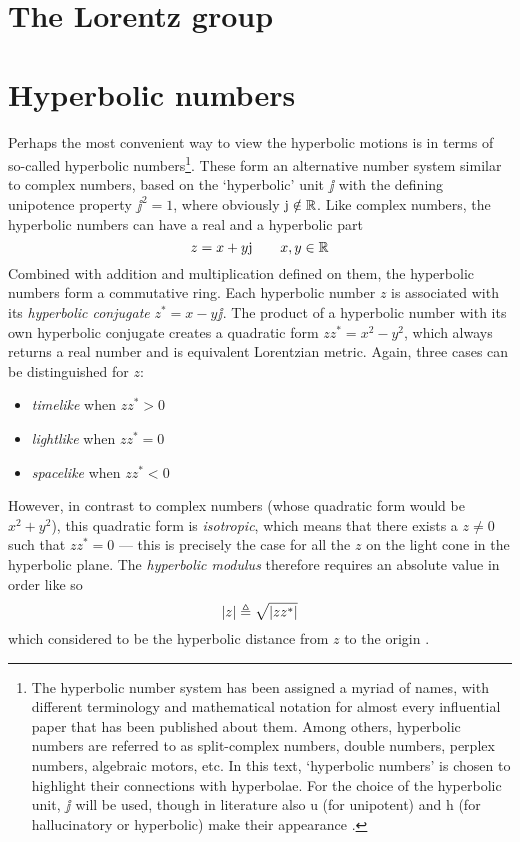 \section{The Lorentz group}

\section{Hyperbolic numbers}
Perhaps the most convenient way to view the hyperbolic motions is in terms of so-called hyperbolic numbers\footnote{The hyperbolic number system has been assigned a myriad of names, with different terminology and mathematical notation for almost every influential paper that has been published about them. Among others, hyperbolic numbers are referred to as split-complex numbers, double numbers, perplex numbers, algebraic motors, etc. In this text, `hyperbolic numbers' is chosen to highlight their connections with hyperbolae. For the choice of the hyperbolic unit, \(\jj\) will be used, though in literature also \(\mathrm{u}\) (for unipotent) and \(\mathrm{h}\) (for hallucinatory or hyperbolic) make their appearance \cite{Fjelstad1986, Sobczyk1995, Motter1998, Harkin2004}.}. These form an alternative number system similar to complex numbers, based on the `hyperbolic' unit \(\jj\) with the defining unipotence property \(\jj^2 = 1\), where obviously \(\mathrm{j} \notin \mathbb{R}\). Like complex numbers, the hyperbolic numbers can have a real and a hyperbolic part
\[
     z = x + y\mathrm{j} \qquad x, y \in \mathbb{R}
\]
Combined with addition and multiplication defined on them, the hyperbolic numbers form a commutative ring. Each hyperbolic number \(z\) is associated with its \emph{hyperbolic conjugate} \(z^* = x - y\jj\). The product of a hyperbolic number with its own hyperbolic conjugate creates a quadratic form \(zz^* = x^2 - y^2\), which always returns a real number and is equivalent Lorentzian metric. Again, three cases can be distinguished for \(z\):
\begin{itemize}
    \item \emph{timelike} when \(zz^* > 0\)
    \item \emph{lightlike} when \(zz^* = 0\)
    \item \emph{spacelike} when \(zz^* < 0\)
\end{itemize}
However, in contrast to complex numbers (whose quadratic form would be \(x^2 + y^2\)), this quadratic form is \emph{isotropic}, which means that there exists a \(z \neq 0\) such that \(zz^* = 0\) --- this is precisely the case for all the \(z\) on the light cone in the hyperbolic plane. The \emph{hyperbolic modulus} therefore requires an absolute value in order like so
\[
     \abs{z} \triangleq \sqrt{\abs{zz^*}}
\]
which considered to be the hyperbolic distance from \(z\) to the origin \cite{Sobczyk1995}.

